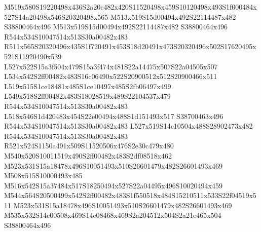 \documentclass{article}
\begin{document}
\begin{multicols}{2}




M519x580S19220498x436S2a20c482x420S11520498x459S10120498x493S1f000484x527S14a20498x546S20320498x565 M513x519S15d00494x492S22114487x482 S38800464x496 M513x519S15d00494x492S22114487x482 S38800464x496 R544x534S10047514x513S30a00482x483 R511x565S20320496x435S1f720491x453S18d20491x473S20320496x502S17620495x521S11920490x539 L527x522S15a3f504x479S15a3f474x481S22a14475x507S22a04505x507 L534x542S2ff00482x483S16c06490x522S20900512x512S20900466x511 L519x515S1ce18481x485S1ce10497x485S2fb06497x499 L549x518S2ff00482x483S18028519x489S22104537x479 R544x534S10047514x513S30a00482x483 L518x546S1d420483x454S22e00494x488S1d151493x517 S38700463x496 R544x534S10047514x513S30a00482x483 L527x519S14c10504x488S28902473x482 R544x534S10047514x513S30a00482x483 R521x524S1150a491x509S11520506x476S2e30c479x480 M540x520S10011519x490S2ff00482x483S2df08518x462 M523x531S15a18478x496S10051493x510S26601479x482S26601493x469 M508x515S10000493x485 M516x542S15a37484x517S18250494x527S22a04495x496S10020494x459 M544x564S20500499x542S2ff00482x483S1f550518x484S15210511x533S22f04519x511 M523x531S15a18478x496S10051493x510S26601479x482S26601493x469 M535x532S14c00508x469S14c08468x469S2a204512x504S2a21c465x504 S38800464x496



\end{multicols}
\end{document}

